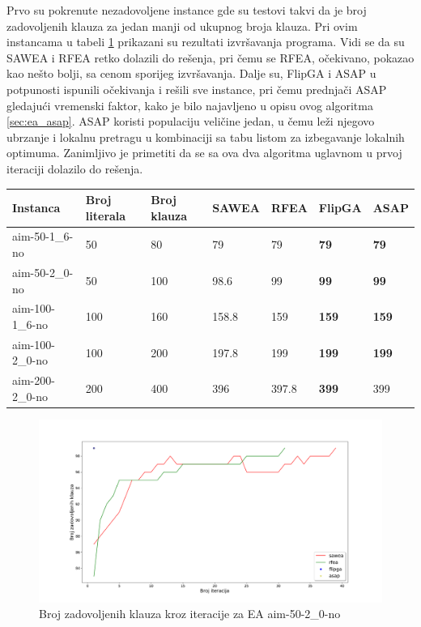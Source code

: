 \documentclass[a4paper]{article}
\begin{document}
Prvo su pokrenute nezadovoljene instance gde su testovi takvi da je broj zadovoljenih klauza
za jedan manji od ukupnog broja klauza. Pri ovim instancama u tabeli \ref{tab:ea_UNSAT}
prikazani su rezultati izvršavanja programa. Vidi se da su SAWEA i RFEA retko dolazili
do rešenja, pri čemu se RFEA, očekivano, pokazao kao nešto bolji, sa cenom sporijeg
izvršavanja. Dalje su, FlipGA i ASAP u potpunosti ispunili očekivanja i rešili sve instance,
pri čemu prednjači ASAP gledajući vremenski faktor, kako je bilo najavljeno u opisu ovog 
algoritma \ref{sec:ea_asap}. ASAP koristi populaciju veličine jedan, u čemu leži njegovo
ubrzanje i lokalnu pretragu u kombinaciji sa tabu listom za izbegavanje lokalnih optimuma.
Zanimljivo je primetiti da se sa ova dva algoritma uglavnom u prvoj iteraciji dolazilo do 
rešenja.

\begin{table}[h!]
\centering
{}\label{tab:ea_UNSAT}
\begin{tabular}{ |p{2.5cm}|p{1.4cm}|p{1.4cm}||p{1.6cm}|p{1.6cm}|p{1.6cm}|p{1.6cm}|} 
 \hline
 Instanca & Broj \break literala & Broj \break klauza & SAWEA & RFEA & FlipGA & ASAP \\ 
 \hline
 aim-50-1\_6-no & 50 & 80 & 79 & 79 & \textbf{79} & \textbf{79} \\
 aim-50-2\_0-no & 50 & 100 & 98.6 &  99 & \textbf{99} & \textbf{99} \\
 aim-100-1\_6-no & 100 & 160 & 158.8 & 159 & \textbf{159} & \textbf{159} \\
 aim-100-2\_0-no & 100 & 200 & 197.8 & 199 & \textbf{199} & \textbf{199} \\
 aim-200-2\_0-no & 200 & 400 & 396 & 397.8 & \textbf{399} & 399 \\ 
 \hline
\end{tabular}
\end{table}

\begin{figure}[h!]
\centering
\includegraphics[width=\textwidth]{ea-aim-50-2_0-no}
\caption{Broj zadovoljenih klauza kroz iteracije za EA aim-50-2\_0-no}\label{img:ea_no1}
\end{figure}
\end{document}
